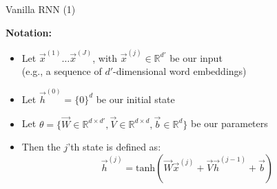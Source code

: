 
\begin{vbframe}{Vanilla RNN (1)}

\vfill

\textbf{Notation:}

\begin{itemize}
	\item Let $\vec x^{(1)} \ldots \vec x^{(J)}$, with $\vec x^{(j)} \in \mathbb{R}^{d'}$ be our input\\
				(e.g., a sequence of $d'$-dimensional word embeddings)
	\item Let $\vec h^{(0)}  = \{0\}^{d}$ be our initial state
	\item Let $\theta = \{\vec W \in \mathbb{R}^{d \times d'}, \vec V \in \mathbb{R}^{d \times d}, \vec b \in \mathbb{R}^{d}\}$ be our parameters
	\item Then the $j$'th state is defined as:
	$$\vec h^{(j)} = \mathrm{tanh}(\vec W \vec x^{(j)}  + \vec V \vec h^{({j-1})} + \vec b)$$
\end{itemize}

\vfill

\end{vbframe}


